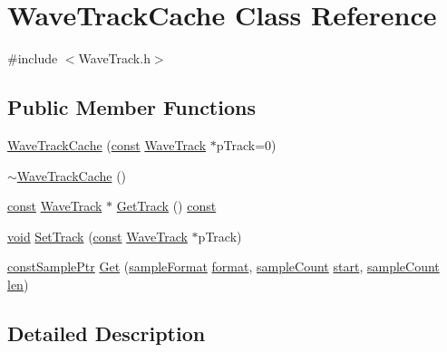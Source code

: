 \hypertarget{class_wave_track_cache}{}\section{Wave\+Track\+Cache Class Reference}
\label{class_wave_track_cache}


{\ttfamily \#include $<$Wave\+Track.\+h$>$}

\subsection*{Public Member Functions}
\begin{DoxyCompactItemize}
\item 
\hyperlink{class_wave_track_cache_a9b827b1978afc820cd9e00e5bb241e14}{Wave\+Track\+Cache} (\hyperlink{getopt1_8c_a2c212835823e3c54a8ab6d95c652660e}{const} \hyperlink{class_wave_track}{Wave\+Track} $\ast$p\+Track=0)
\item 
\hyperlink{class_wave_track_cache_ab047b20fa99329025aa65db1af601e5c}{$\sim$\+Wave\+Track\+Cache} ()
\item 
\hyperlink{getopt1_8c_a2c212835823e3c54a8ab6d95c652660e}{const} \hyperlink{class_wave_track}{Wave\+Track} $\ast$ \hyperlink{class_wave_track_cache_a7f431e21835e425e61bfd52f5f310a1f}{Get\+Track} () \hyperlink{getopt1_8c_a2c212835823e3c54a8ab6d95c652660e}{const} 
\item 
\hyperlink{sound_8c_ae35f5844602719cf66324f4de2a658b3}{void} \hyperlink{class_wave_track_cache_a267446b098e82cda876480feebf5fc9c}{Set\+Track} (\hyperlink{getopt1_8c_a2c212835823e3c54a8ab6d95c652660e}{const} \hyperlink{class_wave_track}{Wave\+Track} $\ast$p\+Track)
\item 
\hyperlink{include_2audacity_2_types_8h_ae9d797c03eedf134ab8f620fc7bc753e}{const\+Sample\+Ptr} \hyperlink{class_wave_track_cache_a13aabc9536d3b6c0013b03f1ebb9e271}{Get} (\hyperlink{include_2audacity_2_types_8h_a9938d2e2f6adef23e745cd80ef379792}{sample\+Format} \hyperlink{_export_p_c_m_8cpp_a317afff57d87a89158c2b038d37b2b08}{format}, \hyperlink{include_2audacity_2_types_8h_afa427e1f521ea5ec12d054e8bd4d0f71}{sample\+Count} \hyperlink{seqread_8c_ac503262ae470564980711da4f78b1181}{start}, \hyperlink{include_2audacity_2_types_8h_afa427e1f521ea5ec12d054e8bd4d0f71}{sample\+Count} \hyperlink{lib_2expat_8h_af86d325fecfc8f47b61fbf5a5146f582}{len})
\end{DoxyCompactItemize}


\subsection{Detailed Description}


